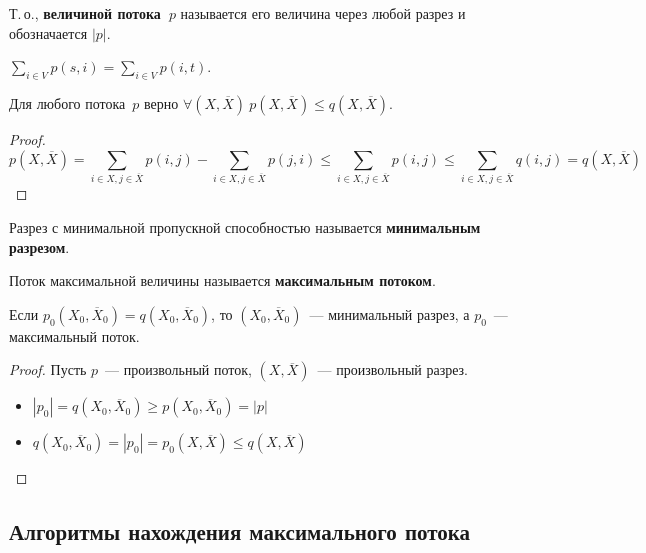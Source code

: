 Т.\,о., \textbf{величиной потока~$p$} называется его величина через любой разрез и обозначается $|p|$.

\begin{consequent}
$\sum\limits_{i \in V} p(s, i) = \sum\limits_{i \in V} p(i, t)$.
\end{consequent}

\begin{lemma}
Для любого потока~$p$ верно $\forall (X, \overline X) \ p(X, \overline X) \leqslant q(X, \overline X)$.
\end{lemma}
\begin{proof}
\begin{equation*}
p(X, \overline X) =
\sum_{i \in X, j \in \overline X} p(i, j) - \sum_{i \in X, j \in \overline X} p(j, i) \leqslant
\sum_{i \in X, j \in \overline X} p(i, j) \leqslant
\sum_{i \in X, j \in \overline X} q(i, j) =
q(X, \overline X)
\end{equation*}
\end{proof}

Разрез с минимальной пропускной способностью называется \textbf{минимальным разрезом}.

Поток максимальной величины называется \textbf{максимальным потоком}.

\begin{lemma}
Если $p_0(X_0, \overline X_0) = q(X_0, \overline X_0)$, то $(X_0, \overline X_0)$~--- минимальный разрез, а $p_0$~--- максимальный поток.
\end{lemma}
\begin{proof}
Пусть $p$~--- произвольный поток, $(X, \overline X)$~--- произвольный разрез.
\begin{itemize}
	\item $|p_0| = q(X_0, \overline X_0) \geqslant p(X_0, \overline X_0) = |p|$
	\item $q(X_0, \overline X_0) = |p_0| = p_0(X, \overline X) \leqslant q(X, \overline X)$
\end{itemize}
\end{proof}

\subsection{Алгоритмы нахождения максимального потока}
